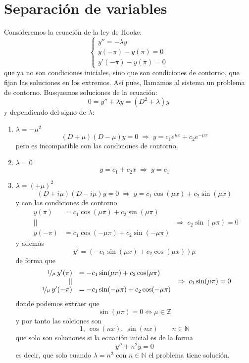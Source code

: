     \section{Separación de variables}
    \begin{eje}
        Consideremos la ecuación de la ley de Hooke:
        $$\left\{ \begin{array}{l}
             y''=-\lambda y \\
            y(-\pi)-y(\pi)=0 \\
            y'(-\pi)-y(\pi)=0
        \end{array} 
        \right.$$
        que ya no son condiciones iniciales, sino que son condiciones de contorno, que fijan las soluciones en los extremos. Así pues, llamamos al sistema un problema de contorno. Busquemos soluciones de la ecuación:
        $$0=y''+\lambda y=(D^2+\lambda)y$$
        y dependiendo del signo de $\lambda$:
        \begin{enumerate}
            \item $\lambda=-\mu^2$
        $$(D+\mu)(D-\mu)y=0 \; \Rightarrow \; y=c_1 e^{\mu x} + c_2 e^{-\mu x}$$
        pero es incompatible con las condiciones de contorno.
        \item $\lambda =0 $
        $$y=c_1+c_2x \; \Rightarrow \; y=c_1$$
        \item $\lambda=(+\mu)^2$
        $$(D+i\mu)(D-i\mu)y=0\; \Rightarrow \; y = c_1 \cos (\mu x)+c_2 \sin (\mu x)$$
        y con las condiciones de contorno
        $$\begin{array}{rl}
             y(\pi) & = c_1 \cos (\mu \pi)+c_2 \sin (\mu \pi)  \\
             || & \\
             y(-\pi) & = c_1 \cos (-\mu \pi)+c_2 \sin (-\mu \pi) 
        \end{array} \; \Rightarrow \; c_2 \sin(\mu \pi )=0$$
        y además
        $$y'=(-c_1\sin(\mu x)+c_2 \cos(\mu x))\mu$$
        de forma que 
        $$\begin{array}{rl}
             \nicefrac{1}{\mu}\:  y'(\pi) & = - c_1 \sin (\mu \pi)+c_2 \cos (\mu \pi)  \\
             || & \\
             \nicefrac{1}{\mu} \: y'(-\pi) & = - c_1 \sin (-\mu \pi)+c_2 \cos (-\mu \pi) 
        \end{array} \; \Rightarrow \; c_1 \sin(\mu \pi )=0$$
        donde podemos extraer que
        $$\sin(\mu \pi)=0 \iff \mu \in \mathbb Z$$
        y por tanto las solciones son 
        $$1, \: \cos(nx), \: \sin (nx) \qquad n \in \mathbb N$$
        que solo son soluciones si la ecuación inicial es de la forma
        $$y''+n^2y=0$$
        es decir, que solo cuando $\lambda=n^2$ con $n \in \mathbb N$ el problema tiene solución. \end{enumerate}
    \end{eje}

